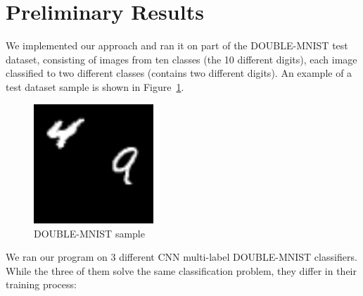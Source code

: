 \documentclass[11pt]{article}
\begin{document}
\section{Preliminary Results}
We implemented our approach and ran it on part of the DOUBLE-MNIST test dataset, consisting of images from ten classes (the 10 different digits), each image classified to two different classes (contains two different digits).
An example of a test dataset sample is shown in Figure~\ref{DOUBLE-MNIST sample}.
\begin{figure}
    \centering
    \includegraphics[width=0.4\textwidth]{3.png}
    \caption{DOUBLE-MNIST sample}
    \label{DOUBLE-MNIST sample}
\end{figure}

We ran our program on 3 different CNN multi-label DOUBLE-MNIST classifiers.
While the three of them solve the same classification problem, they differ in their training process:
\end{document}
